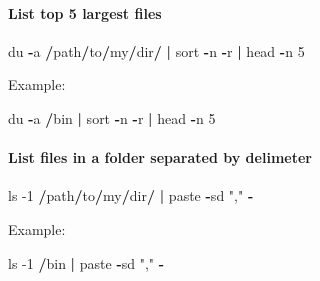 \documentclass[openany]{article}
\newenvironment{Shaded}{\begin{snugshade}}{\end{snugshade}}
\newcommand{\DecValTok}[1]{\textcolor[rgb]{0.00,0.00,0.81}{#1}}
\newcommand{\ErrorTok}[1]{\textcolor[rgb]{0.64,0.00,0.00}{\textbf{#1}}}
\newcommand{\NormalTok}[1]{#1}
\newcommand{\OperatorTok}[1]{\textcolor[rgb]{0.81,0.36,0.00}{\textbf{#1}}}
\newcommand{\StringTok}[1]{\textcolor[rgb]{0.31,0.60,0.02}{#1}}
\let\oldparagraph\paragraph
\renewcommand{\paragraph}[1]{\oldparagraph{#1}\mbox{}}
\begin{document}
\hypertarget{list-top-5-largest-files}{%
\paragraph{List top 5 largest files}\label{list-top-5-largest-files}}

\begin{Shaded}
\begin{Highlighting}[]
\NormalTok{du }\OperatorTok{-}\NormalTok{a }\OperatorTok{/}\NormalTok{path}\OperatorTok{/}\NormalTok{to}\OperatorTok{/}\NormalTok{my}\OperatorTok{/}\NormalTok{dir}\OperatorTok{/}\StringTok{ }\ErrorTok{|}\StringTok{ }\NormalTok{sort }\OperatorTok{-}\NormalTok{n }\OperatorTok{-}\NormalTok{r }\OperatorTok{|}\StringTok{ }\NormalTok{head }\OperatorTok{-}\NormalTok{n }\DecValTok{5}
\end{Highlighting}
\end{Shaded}

Example:

\begin{Shaded}
\begin{Highlighting}[]
\NormalTok{du }\OperatorTok{-}\NormalTok{a }\OperatorTok{/}\NormalTok{bin }\OperatorTok{|}\StringTok{ }\NormalTok{sort }\OperatorTok{-}\NormalTok{n }\OperatorTok{-}\NormalTok{r }\OperatorTok{|}\StringTok{ }\NormalTok{head }\OperatorTok{-}\NormalTok{n }\DecValTok{5}
\end{Highlighting}
\end{Shaded}

\hypertarget{list-files-in-a-folder-separated-by-delimeter}{%
\paragraph{List files in a folder separated by delimeter}\label{list-files-in-a-folder-separated-by-delimeter}}

\begin{Shaded}
\begin{Highlighting}[]
\NormalTok{ls }\DecValTok{-1} \OperatorTok{/}\NormalTok{path}\OperatorTok{/}\NormalTok{to}\OperatorTok{/}\NormalTok{my}\OperatorTok{/}\NormalTok{dir}\OperatorTok{/}\StringTok{ }\ErrorTok{|}\StringTok{ }\NormalTok{paste }\OperatorTok{-}\NormalTok{sd }\StringTok{","} \OperatorTok{-}
\end{Highlighting}
\end{Shaded}

Example:

\begin{Shaded}
\begin{Highlighting}[]
\NormalTok{ls }\DecValTok{-1} \OperatorTok{/}\NormalTok{bin }\OperatorTok{|}\StringTok{ }\NormalTok{paste }\OperatorTok{-}\NormalTok{sd }\StringTok{","} \OperatorTok{-}
\end{Highlighting}
\end{Shaded}
\end{document}
